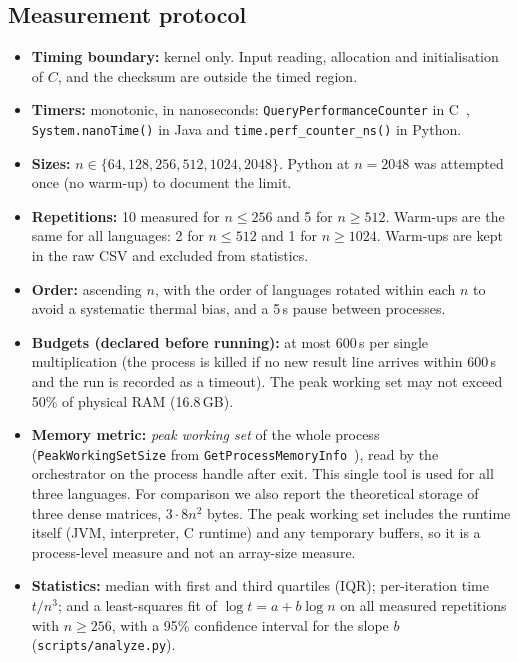 \documentclass[11pt,a4paper]{article}
\begin{document}
\subsection{Measurement protocol}
\begin{itemize}
  \item \textbf{Timing boundary:} kernel only. Input reading, allocation and initialisation of $C$,
        and the checksum are outside the timed region.
  \item \textbf{Timers:} monotonic, in nanoseconds: \texttt{QueryPerformanceCounter} in C~\cite{ms_qpc},
        \texttt{System.nanoTime()} in Java and \texttt{time.perf\_counter\_ns()} in Python.
  \item \textbf{Sizes:} $n \in \{64, 128, 256, 512, 1024, 2048\}$. Python at $n = 2048$ was attempted
        once (no warm-up) to document the limit.
  \item \textbf{Repetitions:} 10 measured for $n \le 256$ and 5 for $n \ge 512$. Warm-ups are the same for all
        languages: 2 for $n \le 512$ and 1 for $n \ge 1024$. Warm-ups are kept in the raw CSV and
        excluded from statistics.
  \item \textbf{Order:} ascending $n$, with the order of languages rotated within each $n$ to avoid a
        systematic thermal bias, and a 5\,s pause between processes.
  \item \textbf{Budgets (declared before running):} at most 600\,s per single multiplication (the
        process is killed if no new result line arrives within 600\,s and the run is recorded as a timeout).
        The peak working set may not exceed 50\% of physical RAM (16.8\,GB).
  \item \textbf{Memory metric:} \emph{peak working set} of the whole process
        (\texttt{PeakWorkingSetSize} from \texttt{GetProcessMemoryInfo}~\cite{ms_pmc}), read by the
        orchestrator on the process handle after exit. This single tool is used for all three languages.
        For comparison we also report the theoretical storage of three dense matrices, $3\cdot 8n^2$ bytes.
        The peak working set includes the runtime itself (JVM, interpreter, C runtime) and any temporary
        buffers, so it is a process-level measure and not an array-size measure.
  \item \textbf{Statistics:} median with first and third quartiles (IQR); per-iteration time
        $t/n^3$; and a least-squares fit of $\log t = a + b\log n$ on all measured repetitions with
        $n \ge 256$, with a 95\% confidence interval for the slope $b$ (\texttt{scripts/analyze.py}).
\end{itemize}
\end{document}
